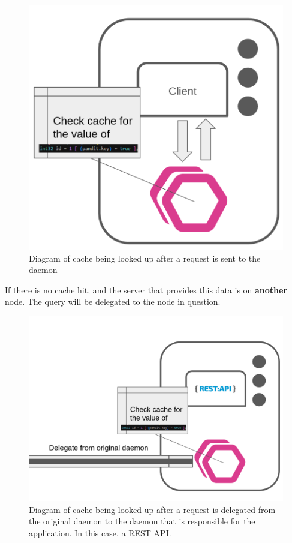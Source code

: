 \documentclass[a4paper,12pt]{report}
\begin{document}
\begin{figure}[hbt!]
    \centering
    \includegraphics[width=\linewidth]{cache.png}
    \caption{Diagram of cache being looked up after a request is sent to the daemon}
    \label{fig:admin}
\end{figure}

If there is no cache hit, and the server that provides this data is on \textbf{another} node. The query will be delegated to the node in question.

\begin{figure}[hbt!]
    \centering
    \includegraphics[width=\linewidth]{cache_del.png}
    \caption{Diagram of cache being looked up after a request is delegated from the original daemon to the daemon that is responsible for the application. In this case, a REST API.}
    \label{fig:admin}
\end{figure}
\end{document}
